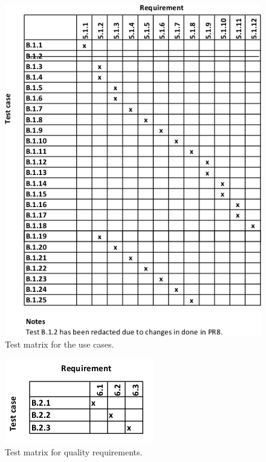 \documentclass[a4paper]{article}
\begin{document}
\begin{figure}[H]
    \centering
    \includegraphics[scale=0.9]{SVVS-pics/testmatrixUsecases.png}
    \caption{Test matrix for the use cases.}
    \label{fig:testmatrix-usecase}
\end{figure}

\begin{figure}[H]
    \centering
    \includegraphics[scale=0.9]{SVVS-pics/testmatrixUsability.png}
    \caption{Test matrix for quality requirements.}
    \label{fig:testmatrix-layout}
\end{figure}
\end{document}
